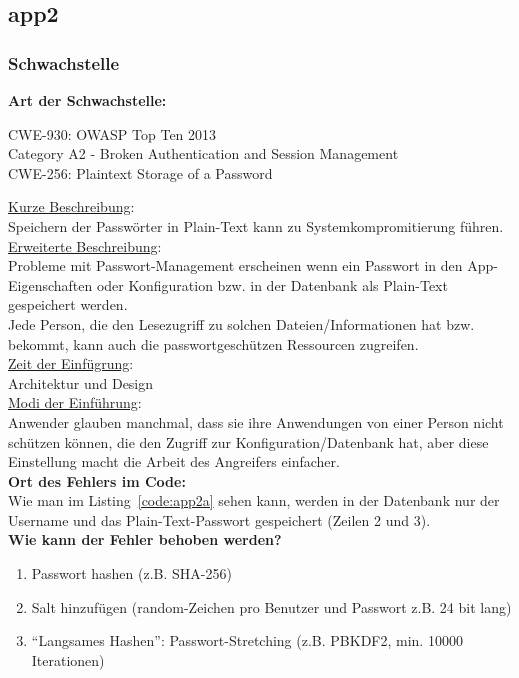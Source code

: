 \documentclass[12pt,a4paper,titlepage,oneside]{scrartcl}
\begin{document}

\subsection{app2}

\subsubsection{Schwachstelle}

\textbf{Art der Schwachstelle:}
\begin{center}
CWE-930: OWASP Top Ten 2013 \\
Category A2 - Broken Authentication and Session Management \\
CWE-256: Plaintext Storage of a Password
\end{center}
\underline{Kurze Beschreibung}: \\[0.5em]
Speichern der Passwörter in Plain-Text kann zu Systemkompromitierung führen. \\[0.5em]
\underline{Erweiterte Beschreibung}: \\[0.5em]
Probleme mit Passwort-Management erscheinen wenn ein Passwort in den App-Eigenschaften oder Konfiguration bzw. in der Datenbank als Plain-Text gespeichert werden. \\
Jede Person, die den Lesezugriff zu solchen Dateien/Informationen hat bzw. bekommt, kann auch die passwortgeschützen Ressourcen zugreifen. \\[0.5em]
\underline{Zeit der Einfügrung}: \\[0.5em]
Architektur und Design \\[0.5em]
\underline{Modi der Einführung}: \\[0.5em]
Anwender glauben manchmal, dass sie ihre Anwendungen von einer Person nicht schützen können, die den Zugriff zur Konfiguration/Datenbank hat, aber diese Einstellung macht die Arbeit des Angreifers einfacher. \\[1em]
\textbf{Ort des Fehlers im Code:} \\[0.5em]
Wie man im Listing~\ref*{code:app2a} sehen kann, werden in der Datenbank nur der Username und das Plain-Text-Passwort gespeichert (Zeilen 2 und 3). \\[1em]
\textbf{Wie kann der Fehler behoben werden?}
\begin{enumerate}
	\item Passwort hashen (z.B. SHA-256)
	\item Salt hinzufügen (random-Zeichen pro Benutzer und Passwort z.B. 24 bit lang)
	\item "`Langsames Hashen"': Passwort-Stretching (z.B. PBKDF2, min. 10000 Iterationen)
\end{enumerate}
\end{document}
